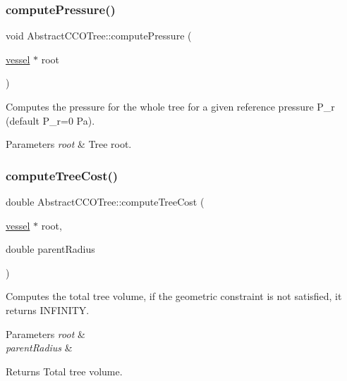 \subsubsection{\texorpdfstring{compute\+Pressure()}{computePressure()}}
{\footnotesize\ttfamily void Abstract\+C\+C\+O\+Tree\+::compute\+Pressure (\begin{DoxyParamCaption}\item[{\mbox{\hyperlink{structvessel}{vessel}} $\ast$}]{root }\end{DoxyParamCaption})}

Computes the pressure for the whole tree for a given reference pressure P\+\_\+r (default P\+\_\+r=0 Pa). 
\begin{DoxyParams}{Parameters}
{\em root} & Tree root. \\
\hline
\end{DoxyParams}
\mbox{\label{class_abstract_c_c_o_tree_a34b65794f85e0569fe09ac1cf337d70d}} 
\subsubsection{\texorpdfstring{compute\+Tree\+Cost()}{computeTreeCost()}}
{\footnotesize\ttfamily double Abstract\+C\+C\+O\+Tree\+::compute\+Tree\+Cost (\begin{DoxyParamCaption}\item[{\mbox{\hyperlink{structvessel}{vessel}} $\ast$}]{root,  }\item[{double}]{parent\+Radius }\end{DoxyParamCaption})\hspace{0.3cm}{\ttfamily [protected]}}

Computes the total tree volume, if the geometric constraint is not satisfied, it returns I\+N\+F\+I\+N\+I\+TY. 
\begin{DoxyParams}{Parameters}
{\em root} & \\
\hline
{\em parent\+Radius} & \\
\hline
\end{DoxyParams}
\begin{DoxyReturn}{Returns}
Total tree volume. 
\end{DoxyReturn}
\mbox{\label{class_abstract_c_c_o_tree_aa044337119c45985addba3ff7d554de2}} 
